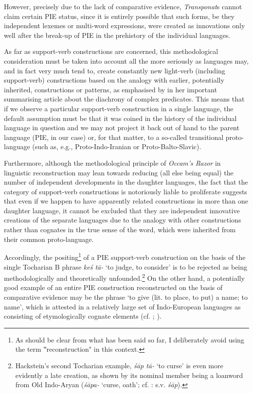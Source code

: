 \documentclass[output=paper,colorlinks,citecolor=brown]{langscibook}
\begin{document}
However, precisely due to the lack of comparative evidence, \textit{Transponat}s cannot claim certain PIE status, since it is entirely possible that such forms, be they independent lexemes or multi-word expressions, were created as innovations only well after the break-up of PIE in the prehistory of the individual languages.

As far as support-verb constructions are concerned, this methodological consideration must be taken into account all the more seriously as languages may, and in fact very much tend to, create constantly new light-verb (including support-verb) constructions based on the analogy with earlier, potentially inherited, constructions or patterns, as emphasised by \citet{Bowern2008} in her important summarising article about the diachrony of complex predicates. This means that if we observe a particular support-verb construction in a single language, the default assumption must be that it was coined in the history of the individual language in question and we may not project it back out of hand to the parent language (PIE, in our case) or, for that matter, to a so-called transitional proto-language (such as, e.g., Proto-Indo-Iranian or Proto-Balto-Slavic).

Furthermore, although the methodological principle of \textit{Occam’s Razor} in linguistic reconstruction may lean towards reducing (all else being equal) the number of independent developments in the daughter languages, the fact that the category of support-verb constructions is notoriously liable to proliferate suggests that even if we happen to have apparently related constructions in more than one daughter language, it cannot be excluded that they are independent innovative creations of the separate languages due to the analogy with other constructions rather than cognates in the true sense of the word, which were inherited from their common proto-language.

Accordingly, the positing\footnote{As should be clear from what has been said so far, I deliberately avoid using the term ‟reconstruction" in this context.}
of a PIE support-verb construction on the basis of the single Tocharian B phrase \textit{keś tā-} ‘to judge, to consider’ is to be rejected as being methodologically and theoretically unfounded.\footnote{Hackstein’s second Tocharian example, \textit{śāp tā‑} ‘to curse’ is even more evidently a late creation, as shown by its nominal member being a loanword from Old Indo-Aryan (\textit{śāpa‑} ‘curse, oath’; cf. \citealt{Adams2013}: s.v. \textit{śāp}).}      On the other hand, a potentially good example of an entire PIE construction reconstructed on the basis of comparative evidence may be the phrase ‘to give (lit. to place, to put) a name; to name’, which is attested in a relatively large set of Indo-European languages as consisting of etymologically cognate elements (cf. \citealt[6]{Hackstein2002b}; \citealt[115--117]{Schutzeichel2014}).
\end{document}
